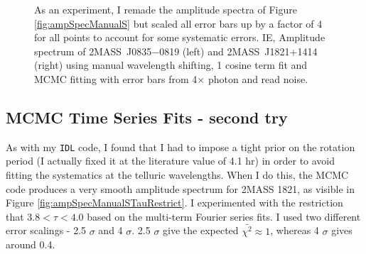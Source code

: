 \documentclass[twocolumn]{aastex6}
\newcommand{\sha}{2MASS~J0835$-$0819}
\newcommand{\shb}{2MASS~J1821+1414}
\begin{document}
\begin{figure}[!t]
\centering
{}
	\caption{As an experiment, I remade the amplitude spectra of Figure \ref{fig:ampSpecManualS} but scaled all error bars up by a factor of 4 for all points to account for some systematic errors. IE, Amplitude spectrum of {\sha} (left)  and {\shb} (right) using manual wavelength shifting, 1 cosine term fit and MCMC fitting with error bars from 4$\times$ photon and read noise.}
	\label{fig:ampSpecManualSfourTimesErr}
	\vspace{0.1in}
\end{figure} 

\clearpage
\pagebreak
\subsection{MCMC Time Series Fits - second try}

As with my \texttt{IDL} code, I found that I had to impose a tight prior on the rotation period (I actually fixed it at the literature value of 4.1 hr) in order to avoid fitting the systematics at the telluric wavelengths.
When I do this, the MCMC code produces a very smooth amplitude spectrum for 2MASS 1821, as visible in Figure \ref{fig:ampSpecManualSTauRestrict}.
I experimented with the restriction that $3.8 < \tau < 4.0$ based on the multi-term Fourier series fits.
I used two different error scalings - 2.5 $\sigma$ and 4 $\sigma$.
2.5 $\sigma$ give the expected $\bar{\chi^2} \approx 1$, whereas 4 $\sigma$ gives around 0.4.
\end{document}
